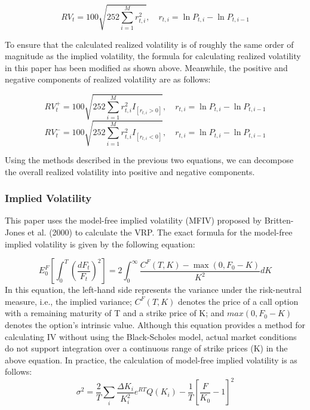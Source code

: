 \documentclass[a4paper, 12pt]{article}    %
\begin{document}
        \begin{equation}
        RV_t = 100\sqrt{252\sum_{i=1}^{M} r_{t,i}^2}, \quad r_{t,i} = \ln P_{t,i} - \ln P_{t,i-1}
        \end{equation}
        
To ensure that the calculated realized volatility is of roughly the same order of magnitude as the implied volatility, the formula for calculating realized volatility in this paper has been modified as shown above. Meanwhile, the positive and negative components of realized volatility are as follows:

        \begin{equation}
        RV^+_t = 100\sqrt{252\sum_{i=1}^{M} r_{t,i}^2I_{[r_{t,i} > 0]}}, \quad r_{t,i} = \ln P_{t,i} - \ln P_{t,i-1}
        \end{equation}
        \begin{equation}
        RV^-_t = 100\sqrt{252\sum_{i=1}^{M} r_{t,i}^2I_{[r_{t,i} < 0]}}, \quad r_{t,i} = \ln P_{t,i} - \ln P_{t,i-1}
        \end{equation}
        
Using the methods described in the previous two equations, we can decompose the overall realized volatility into positive and negative components.

\subsubsection{Implied Volatility}
This paper uses the model-free implied volatility (MFIV) proposed by Britten-Jones et al. (2000) to calculate the VRP. The exact formula for the model-free implied volatility is given by the following equation:

\begin{equation}
    E_0^F \left[ \int_0^T \left( \frac{dF_t}{F_t} \right)^2 \right] = 2\int_0^\infty \frac{C^F(T, K) - \max(0, F_0 - K)}{K^2} dK
\end{equation}
In this equation, the left-hand side represents the variance under the risk-neutral measure, i.e., the implied variance; $C^F(T, K)$ denotes the price of a call option with a remaining maturity of T and a strike price of K; and $max(0, F_0 - K)$ denotes the option’s intrinsic value.
Although this equation provides a method for calculating IV without using the Black-Scholes model, actual market conditions do not support integration over a continuous range of strike prices (K) in the above equation. In practice, the calculation of model-free implied volatility is as follows:
\begin{equation}
    \sigma^2 = \frac{2}{T} \sum_i \frac{\Delta K_i}{K_i^2} e^{RT} Q(K_i) - \frac{1}{T} \left[ \frac{F}{K_0} - 1 \right]^2
\end{equation}
\end{document}
